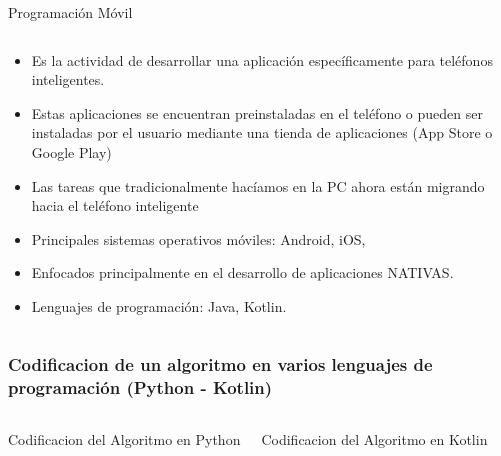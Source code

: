 
\begin{frame}{Programación Móvil}
\begin{columns}
\begin{column}{0.98\textwidth}
    \begin{center}

\begin{itemize}
\item Es la actividad de desarrollar una aplicación específicamente para teléfonos inteligentes.
\item Estas aplicaciones se encuentran preinstaladas en el teléfono o pueden ser instaladas por el usuario mediante una tienda de aplicaciones (App Store o Google Play)
\item Las tareas que tradicionalmente hacíamos en la PC ahora están migrando hacia el teléfono inteligente
\item Principales sistemas operativos móviles: Android, iOS,
\item Enfocados principalmente en el desarrollo de aplicaciones NATIVAS.
\item Lenguajes de programación: Java, Kotlin.
\end{itemize}
     \end{center}

\end{column}
\end{columns}
\end{frame}


\begin{frame}
\frametitle{Codificacion de un algoritmo en varios lenguajes de programaci\'on (Python - Kotlin)} 
\begin{columns}
\begin{block}{Codificacion del Algoritmo en Python}
\inputminted[linenos,fontsize=\tiny]{python}{00_IntroProgramacionYMoviles/Hello.py}
\end{block}
\begin{block}{Codificacion del Algoritmo en Kotlin}
\inputminted[linenos,fontsize=\tiny]{python}{00_IntroProgramacionYMoviles/Hello.kt}
\end{block}
\end{columns}
\end{frame}



